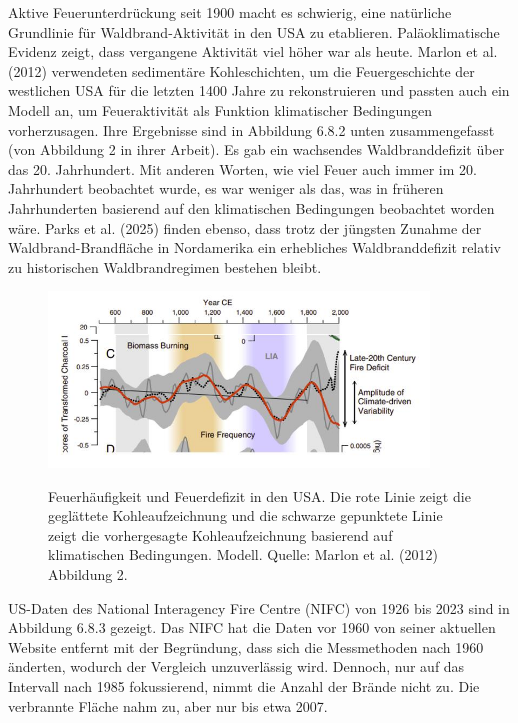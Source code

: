 \documentclass[12pt,paper=a4,DIV=12,parskip=never,chapterprefix=false,headings=standardclasses]{scrreprt}
\begin{document}
Aktive Feuerunterdrückung seit 1900 macht es schwierig, eine natürliche Grundlinie für Waldbrand-Aktivität in den USA zu etablieren. Paläoklimatische Evidenz zeigt, dass vergangene Aktivität viel höher war als heute. Marlon et al. (2012) verwendeten sedimentäre Kohleschichten, um die Feuergeschichte der westlichen USA für die letzten 1400 Jahre zu rekonstruieren und passten auch ein Modell an, um Feueraktivität als Funktion klimatischer Bedingungen vorherzusagen. Ihre Ergebnisse sind in Abbildung 6.8.2 unten zusammengefasst (von Abbildung 2 in ihrer Arbeit). Es gab ein wachsendes Waldbranddefizit über das 20. Jahrhundert. Mit anderen Worten, wie viel Feuer auch immer im 20. Jahrhundert beobachtet wurde, es war weniger als das, was in früheren Jahrhunderten basierend auf den klimatischen Bedingungen beobachtet worden wäre. Parks et al. (2025) finden ebenso, dass trotz der jüngsten Zunahme der Waldbrand-Brandfläche in Nordamerika ein erhebliches Waldbranddefizit relativ zu historischen Waldbrandregimen bestehen bleibt.

\begin{figure}[H]
\begin{center}
\includegraphics[width=0.9\textwidth]{bilder/bilderKlima-0064.jpg}\\[1cm]
\end{center}
\caption{Feuerhäufigkeit und Feuerdefizit in den USA. Die rote Linie zeigt die geglättete Kohleaufzeichnung und die schwarze gepunktete Linie zeigt die vorhergesagte Kohleaufzeichnung basierend auf klimatischen Bedingungen. Modell. Quelle: Marlon et al. (2012) Abbildung 2.}
\end{figure}

US-Daten des National Interagency Fire Centre (NIFC) von 1926 bis 2023 sind in Abbildung 6.8.3 gezeigt. Das NIFC hat die Daten vor 1960 von seiner aktuellen Website entfernt mit der Begründung, dass sich die Messmethoden nach 1960 änderten, wodurch der Vergleich unzuverlässig wird. Dennoch, nur auf das Intervall nach 1985 fokussierend, nimmt die Anzahl der Brände nicht zu. Die verbrannte Fläche nahm zu, aber nur bis etwa 2007.
\end{document}
